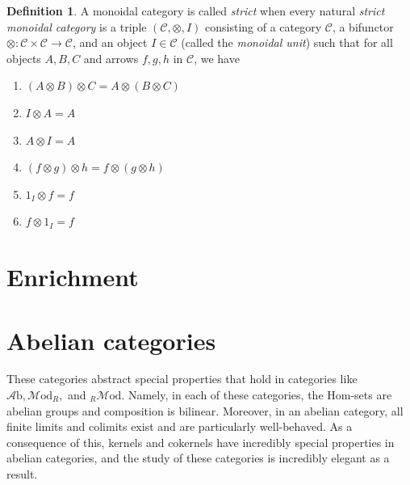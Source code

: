 \documentclass[10pt,oneside]{book}
\def\~#1{\mathscr{#1}}
\newcommand{\Hom}{\mathrm{Hom}}
\newcommand{\Ab}{\~A\mathrm{b}}
\newcommand{\Mod}{\~M\mathrm{od}}
\theoremstyle{plain}
\theoremstyle{definition}
\newtheorem{defn}[thm]{Definition}
\theoremstyle{remark}
\numberwithin{equation}{section}
\numberwithin{figure}{section}
\begin{document}
\begin{defn}
    A monoidal category is called \emph{strict} when every natural \emph{strict monoidal category} is a triple $(\~C, \otimes, I)$ consisting of a category $\~C$, a bifunctor $\otimes: \~C \times \~C \to \~C$, and an object $I \in \~C$ (called the \emph{monoidal unit}) such that for all objects $A, B, C$ and arrows $f, g, h$ in $\~C$, we have
    \begin{enumerate}[label=(\roman*)]
        \item $(A \otimes B) \otimes C = A \otimes (B \otimes C)$
        \item $I \otimes A = A$
        \item $A \otimes I = A$
        \item $(f \otimes g) \otimes h = f \otimes (g \otimes h)$
        \item $1_I \otimes f = f$
        \item $f \otimes 1_I = f$
    \end{enumerate}
\end{defn}

\chapter{Enrichment}
\label{chap:enrichment}

\chapter{Abelian categories}
\label{chap:abelian_cats}
These categories abstract special properties that hold in categories like $\Ab, \Mod_R,$ and $_{R}\Mod$. Namely, in each of these categories, the $\Hom$-sets are abelian groups and composition is bilinear. Moreover, in an abelian category, all finite limits and colimits exist and are particularly well-behaved. As a consequence of this, kernels and cokernels have incredibly special properties in abelian categories, and the study of these categories is incredibly elegant as a result.   
\end{document}
